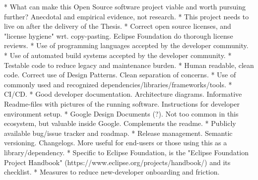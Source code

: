 * What can make this Open Source software project viable and worth pursuing further? Anecdotal and empirical evidence, not research.
  * This project needs to live on after the delivery of the Thesis.
  * Correct open source licenses, and "license hygiene" wrt. copy-pasting. Eclipse Foundation do thorough license reviews.
  * Use of programming languages accepted by the developer community.
  * Use of automated build systems accepted by the developer community.
  * Testable code to reduce legacy and maintenance burden.
  * Human readable, clean code. Correct use of Design Patterns. Clean separation of concerns.
  * Use of commonly used and recognized dependencies/libraries/frameworks/tools.
  * CI/CD.
  * Good developer documentation. Architecture diagrams. Informative Readme-files with pictures of the running software. Instructions for developer environment setup.
  * Google Design Documents (?). Not too common in this ecosystem, but valuable inside Google. Complements the readme.
  * Publicly available bug/issue tracker and roadmap.
  * Release management. Semantic versioning. Changelogs. More useful for end-users or those using this as a library/dependency.
  * Specific to Eclipse Foundation, is the "Eclipse Foundation Project Handbook" (https://www.eclipse.org/projects/handbook/) and its checklist.
  * Measures to reduce new-developer onboarding and friction.
